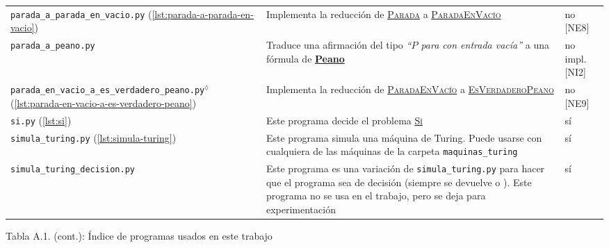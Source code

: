 \begin{tabularx}{\textwidth}{L{0.3} L{0.5} L{0.2}}
\texttt{parada\_a\_parada\_en}\linebreak\texttt{\_vacio.py} \linebreak \small{(\cref{lst:parada-a-parada-en-vacio})} \vspace{4pt} & Implementa la reducción de \hyperref[prob:parada]{\textsc{Parada}} a \hyperref[prob:parada-en-vacio]{\textsc{ParadaEnVacío}} & no [NE8] \\

\texttt{parada\_a\_peano.py} & Traduce una afirmación del tipo \emph{``$P$ para con entrada vacía''} a una fórmula de \hyperref[sl:peano]{\textbf{Peano}} \vspace{4pt} & no impl. [NI2] \\

\texttt{parada\_en\_vacio\_a\_es}\linebreak\texttt{\_verdadero\_peano.py}$^\lozenge$ \linebreak \small{(\cref{lst:parada-en-vacio-a-es-verdadero-peano})} \vspace{4pt} & Implementa la reducción de \hyperref[prob:parada-en-vacio]{\textsc{ParadaEnVacío}} a \hyperref[prob:es-verdadero-peano]{\textsc{EsVerdaderoPeano}} & no [NE9] \\

\texttt{si.py} \linebreak \small{(\cref{lst:si})} \vspace{4pt} & Este programa decide el problema \hyperref[prob:si]{\textsc{Sí}} & sí \\

\texttt{simula\_turing.py} \linebreak \small{(\cref{lst:simula-turing})} & Este programa simula una máquina de Turing. Puede usarse con cualquiera de las máquinas de la carpeta \texttt{maquinas\_turing} \vspace{4pt} & sí \\

\texttt{simula\_turing}\linebreak\texttt{\_decision.py} & Este programa es una variación de \texttt{simula\_turing.py} para hacer que el programa sea de decisión (siempre se devuelve  o ). Este programa no se usa en el trabajo, pero se deja para experimentación \vspace{2pt} & sí \\
\midrule
\end{tabularx}
\vspace*{-0.2cm}
\begin{tabla}
\caption*{Tabla A.1. (cont.): Índice de programas usados en este trabajo}
\label{tab:indice-programas}
\end{tabla}


